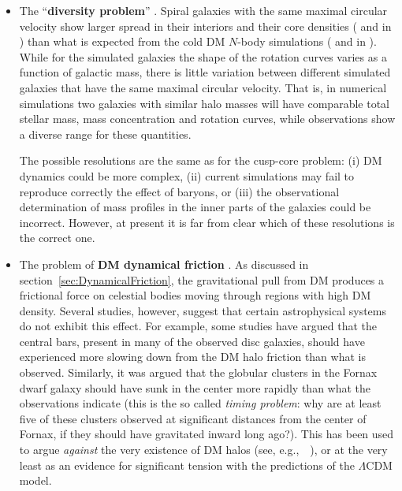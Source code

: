 \begin{itemize}
\item[$\blacktriangleright$]
 The  ``{\bf diversity problem}'' \cite{diversity}. 
Spiral galaxies with the same maximal circular velocity show larger spread in their interiors and their core densities ( and  in \cite{diversity})
than what is expected from the cold DM $N$-body simulations ( and  in \cite{diversity}).
While for the simulated galaxies the shape of the rotation curves varies as a function of galactic mass, there is little variation between different simulated galaxies that have  the same maximal circular velocity. 
That is, in numerical simulations two galaxies with similar halo masses will have comparable total stellar mass, mass concentration and rotation curves, while observations show a diverse range for these quantities.

The possible resolutions are the same as for the cusp-core problem: (i) DM dynamics could be more complex, (ii) current simulations  may fail to reproduce correctly the effect of baryons, or (iii) the observational determination of mass profiles in the inner parts of the galaxies could be incorrect. However, at present it is far from clear which of these resolutions is the correct one.

\item[$\blacktriangleright$] \label{dynamicalfrictionproblem}
The problem of {\bf DM dynamical friction} \cite{problemdynfriction}.
As discussed in section~\ref{sec:DynamicalFriction},
the gravitational pull from DM produces a frictional force on celestial bodies moving through regions with high DM density.
Several studies, however, suggest that certain astrophysical systems do not exhibit this effect.
For example, some studies have argued that the central bars, present in many of the observed disc galaxies, should have experienced more slowing down from the DM halo friction than what is observed. Similarly, it was argued that the globular clusters in the Fornax dwarf galaxy should have sunk in the center more rapidly than what the observations indicate (this is the so called {\em timing problem}: 
why are at least five of these clusters observed at significant distances from the center of Fornax, if they should have gravitated inward long ago?).
This has been used to argue {\em against} the very existence of DM halos
(see, e.g.,~~\cite{DynamicalFriction}), 
or at the very least as an evidence for significant tension with the predictions of the $\Lambda$CDM model. 


\end{itemize}

